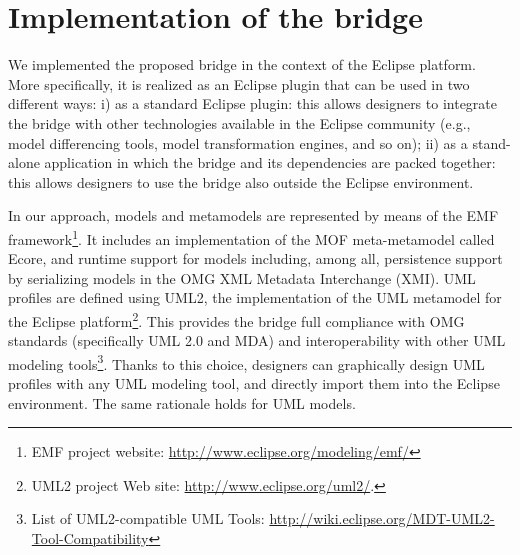 \section{Implementation of the bridge}\label{sec:tool}
We implemented the proposed bridge in the context of the Eclipse platform.
More specifically, it is realized as an Eclipse plugin that can be used in two different ways: i) as a standard Eclipse plugin: this allows designers to integrate the bridge with other technologies available in the Eclipse community (e.g., model differencing tools, model transformation engines, and so on); ii) as a stand-alone application in which the bridge and its dependencies are packed together: this allows designers to use the bridge also outside the Eclipse environment.

In our approach, models and metamodels are represented by means of the EMF
framework\footnote{EMF project website: \small{\url{http://www.eclipse.org/modeling/emf/}}}.
It includes an implementation of the MOF meta-metamodel called Ecore, and runtime support for models including,
among all, persistence support by serializing models in the OMG XML Metadata Interchange (XMI).
UML profiles are defined using UML2,
the implementation of the UML metamodel for the Eclipse
platform\footnote{UML2 project Web site:
\underline{http://www.eclipse.org/uml2/}.}.
This provides the bridge full compliance with OMG standards
(specifically UML 2.0 and MDA) and interoperability with other
UML modeling tools\footnote{List of UML2-compatible UML Tools: \small{\url{http://wiki.eclipse.org/MDT-UML2-Tool-Compatibility}}}. Thanks to this choice, designers can graphically design UML profiles with any UML modeling tool, and directly import them into
the Eclipse environment. The same rationale holds for UML models.
%

